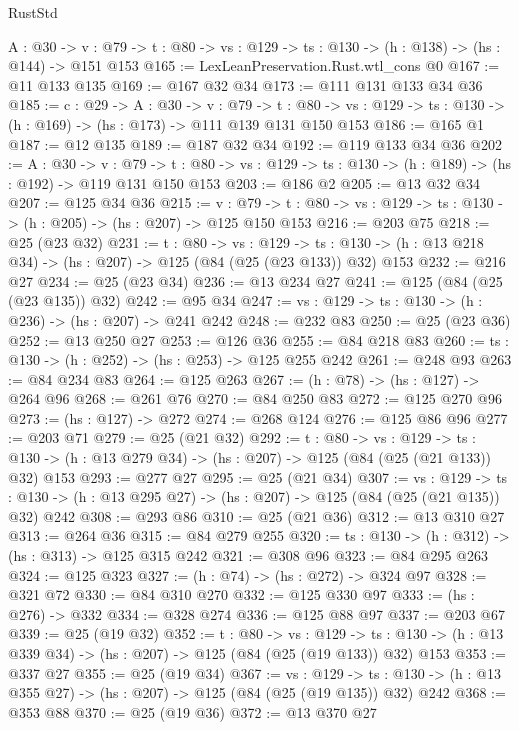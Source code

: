 \begin{lexlean}{RustStd}
\begin{coremodule}
  {A : @30} ->
  {v : @79} -> {t : @80} -> {vs : @129} -> {ts : @130} -> (h : @138) -> (hs : @144) -> @151 @153
@165 := LexLeanPreservation.Rust.wtl_cons @0
@167 := @11 @133 @135
@169 := @167 @32 @34
@173 := @111 @131 @133 @34 @36
@185 := {c : @29} ->
  {A : @30} ->
  {v : @79} ->
  {t : @80} -> {vs : @129} -> {ts : @130} -> (h : @169) -> (hs : @173) -> @111 @139 @131 @150 @153
@186 := @165 @1
@187 := @12 @135
@189 := @187 @32 @34
@192 := @119 @133 @34 @36
@202 := {A : @30} ->
  {v : @79} ->
  {t : @80} -> {vs : @129} -> {ts : @130} -> (h : @189) -> (hs : @192) -> @119 @131 @150 @153
@203 := @186 @2
@205 := @13 @32 @34
@207 := @125 @34 @36
@215 := {v : @79} ->
  {t : @80} -> {vs : @129} -> {ts : @130} -> (h : @205) -> (hs : @207) -> @125 @150 @153
@216 := @203 @75
@218 := @25 (@23 @32)
@231 := {t : @80} ->
  {vs : @129} ->
  {ts : @130} -> (h : @13 @218 @34) -> (hs : @207) -> @125 (@84 (@25 (@23 @133)) @32) @153
@232 := @216 @27
@234 := @25 (@23 @34)
@236 := @13 @234 @27
@241 := @125 (@84 (@25 (@23 @135)) @32)
@242 := @95 @34
@247 := {vs : @129} -> {ts : @130} -> (h : @236) -> (hs : @207) -> @241 @242
@248 := @232 @83
@250 := @25 (@23 @36)
@252 := @13 @250 @27
@253 := @126 @36
@255 := @84 @218 @83
@260 := {ts : @130} -> (h : @252) -> (hs : @253) -> @125 @255 @242
@261 := @248 @93
@263 := @84 @234 @83
@264 := @125 @263
@267 := (h : @78) -> (hs : @127) -> @264 @96
@268 := @261 @76
@270 := @84 @250 @83
@272 := @125 @270 @96
@273 := (hs : @127) -> @272
@274 := @268 @124
@276 := @125 @86 @96
@277 := @203 @71
@279 := @25 (@21 @32)
@292 := {t : @80} ->
  {vs : @129} ->
  {ts : @130} -> (h : @13 @279 @34) -> (hs : @207) -> @125 (@84 (@25 (@21 @133)) @32) @153
@293 := @277 @27
@295 := @25 (@21 @34)
@307 := {vs : @129} ->
  {ts : @130} -> (h : @13 @295 @27) -> (hs : @207) -> @125 (@84 (@25 (@21 @135)) @32) @242
@308 := @293 @86
@310 := @25 (@21 @36)
@312 := @13 @310 @27
@313 := @264 @36
@315 := @84 @279 @255
@320 := {ts : @130} -> (h : @312) -> (hs : @313) -> @125 @315 @242
@321 := @308 @96
@323 := @84 @295 @263
@324 := @125 @323
@327 := (h : @74) -> (hs : @272) -> @324 @97
@328 := @321 @72
@330 := @84 @310 @270
@332 := @125 @330 @97
@333 := (hs : @276) -> @332
@334 := @328 @274
@336 := @125 @88 @97
@337 := @203 @67
@339 := @25 (@19 @32)
@352 := {t : @80} ->
  {vs : @129} ->
  {ts : @130} -> (h : @13 @339 @34) -> (hs : @207) -> @125 (@84 (@25 (@19 @133)) @32) @153
@353 := @337 @27
@355 := @25 (@19 @34)
@367 := {vs : @129} ->
  {ts : @130} -> (h : @13 @355 @27) -> (hs : @207) -> @125 (@84 (@25 (@19 @135)) @32) @242
@368 := @353 @88
@370 := @25 (@19 @36)
@372 := @13 @370 @27

\end{coremodule}
\end{lexlean}
